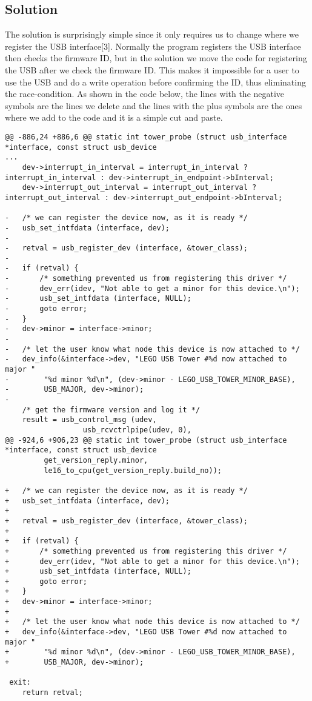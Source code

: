 \documentclass{article}
\begin{document}
\subsection{Solution}
The solution is surprisingly simple since it only requires us to change where we register the USB interface[3]. Normally the program registers the USB interface then checks the firmware ID, but in the solution we move the code for registering the USB after we check the firmware ID. This makes it impossible for a user to use the USB and do a write operation before confirming the ID, thus eliminating the race-condition. As shown in the code below, the lines with the negative symbols are the lines we delete and the lines with the plus symbols are the ones where we add to the code and it is a simple cut and paste.
\begin{lstlisting}[style=CStyle]
@@ -886,24 +886,6 @@ static int tower_probe (struct usb_interface *interface, const struct usb_device
...
 	dev->interrupt_in_interval = interrupt_in_interval ? interrupt_in_interval : dev->interrupt_in_endpoint->bInterval;
 	dev->interrupt_out_interval = interrupt_out_interval ? interrupt_out_interval : dev->interrupt_out_endpoint->bInterval;
 
-	/* we can register the device now, as it is ready */
-	usb_set_intfdata (interface, dev);
-
-	retval = usb_register_dev (interface, &tower_class);
-
-	if (retval) {
-		/* something prevented us from registering this driver */
-		dev_err(idev, "Not able to get a minor for this device.\n");
-		usb_set_intfdata (interface, NULL);
-		goto error;
-	}
-	dev->minor = interface->minor;
-
-	/* let the user know what node this device is now attached to */
-	dev_info(&interface->dev, "LEGO USB Tower #%d now attached to major "
-		 "%d minor %d\n", (dev->minor - LEGO_USB_TOWER_MINOR_BASE),
-		 USB_MAJOR, dev->minor);
-
 	/* get the firmware version and log it */
 	result = usb_control_msg (udev,
 				  usb_rcvctrlpipe(udev, 0),
@@ -924,6 +906,23 @@ static int tower_probe (struct usb_interface *interface, const struct usb_device
 		 get_version_reply.minor,
 		 le16_to_cpu(get_version_reply.build_no));
 
+	/* we can register the device now, as it is ready */
+	usb_set_intfdata (interface, dev);
+
+	retval = usb_register_dev (interface, &tower_class);
+
+	if (retval) {
+		/* something prevented us from registering this driver */
+		dev_err(idev, "Not able to get a minor for this device.\n");
+		usb_set_intfdata (interface, NULL);
+		goto error;
+	}
+	dev->minor = interface->minor;
+
+	/* let the user know what node this device is now attached to */
+	dev_info(&interface->dev, "LEGO USB Tower #%d now attached to major "
+		 "%d minor %d\n", (dev->minor - LEGO_USB_TOWER_MINOR_BASE),
+		 USB_MAJOR, dev->minor);
 
 exit:
 	return retval;
\end{lstlisting}
\end{document}
